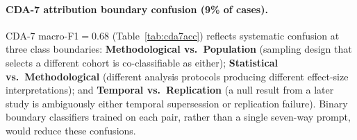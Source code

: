 \documentclass[11pt]{article}
\begin{document}
\paragraph{CDA-7 attribution boundary confusion (9\% of cases).}
CDA-7 macro-F1$=0.68$ (Table~\ref{tab:cda7acc}) reflects systematic confusion at
three class boundaries: \textbf{Methodological vs.\ Population} (sampling
design that selects a different cohort is co-classifiable as either);
\textbf{Statistical vs.\ Methodological} (different analysis protocols
producing different effect-size interpretations); and \textbf{Temporal
vs.\ Replication} (a null result from a later study is ambiguously either
temporal supersession or replication failure).  Binary boundary classifiers
trained on each pair, rather than a single seven-way prompt, would reduce
these confusions.
\end{document}
